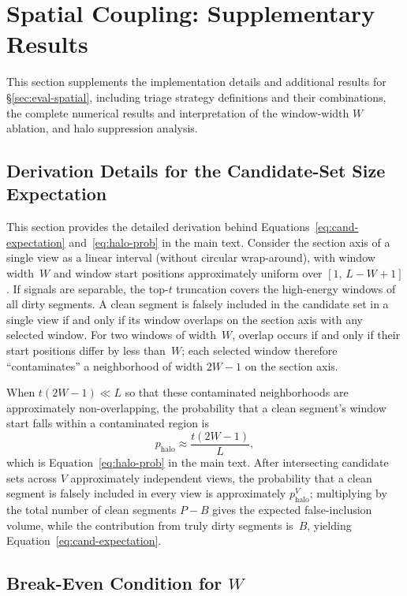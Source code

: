 \section{Spatial Coupling: Supplementary Results}
\label{sec:appendix-spatial}

This section supplements the implementation details and additional results for \S\ref{sec:eval-spatial}, including triage strategy definitions and their combinations, the complete numerical results and interpretation of the window-width $W$ ablation, and halo suppression analysis.


\subsection{Derivation Details for the Candidate-Set Size Expectation}
\label{sec:appendix-candidate-expectation}

This section provides the detailed derivation behind Equations~\eqref{eq:cand-expectation} and~\eqref{eq:halo-prob} in the main text. Consider the section axis of a single view as a linear interval (without circular wrap-around), with window width~$W$ and window start positions approximately uniform over $[1,\,L{-}W{+}1]$. If signals are separable, the top-$t$ truncation covers the high-energy windows of all dirty segments. A clean segment is falsely included in the candidate set in a single view if and only if its window overlaps on the section axis with any selected window. For two windows of width~$W$, overlap occurs if and only if their start positions differ by less than~$W$; each selected window therefore ``contaminates'' a neighborhood of width $2W{-}1$ on the section axis.

When $t(2W{-}1)\ll L$ so that these contaminated neighborhoods are approximately non-overlapping, the probability that a clean segment's window start falls within a contaminated region is
\[
p_{\mathrm{halo}} \approx \frac{t(2W{-}1)}{L},
\]
which is Equation~\eqref{eq:halo-prob} in the main text. After intersecting candidate sets across $V$ approximately independent views, the probability that a clean segment is falsely included in every view is approximately $p_{\mathrm{halo}}^V$; multiplying by the total number of clean segments $P{-}B$ gives the expected false-inclusion volume, while the contribution from truly dirty segments is~$B$, yielding Equation~\eqref{eq:cand-expectation}.

\subsection{Break-Even Condition for $W$}
\label{sec:appendix-w-pricing}

